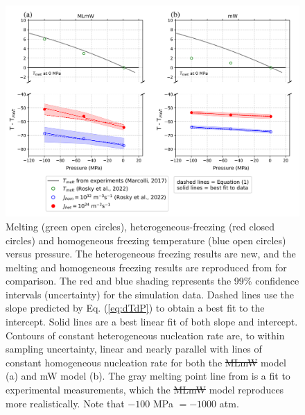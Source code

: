 \documentclass[journal abbreviation, manuscript]{copernicus}
\providecommand{\DIFadd}[1]{{\protect\color{blue}\uwave{#1}}} %
\providecommand{\DIFdel}[1]{{\protect\color{red}\sout{#1}}}                      %
\providecommand{\DIFaddFL}[1]{\DIFadd{#1}} %
\providecommand{\DIFdelFL}[1]{\DIFdel{#1}} %
\providecommand{\DIFaddbeginFL}{} %
\providecommand{\DIFaddendFL}{} %
\providecommand{\DIFdelbeginFL}{} %
\providecommand{\DIFdelendFL}{} %
\begin{document}
\begin{figure}[t]
\includegraphics[width=12cm]{figures/homohet_PT_figure.png}
\caption{\label{fig:PT} Melting (green open circles), heterogeneous-freezing (red closed circles) and homogeneous freezing temperature (blue open circles) versus pressure. The heterogeneous freezing results are new, and the melting and homogeneous freezing results are reproduced from \citet{rosky2022} for comparison. The red and blue shading represents the 99\% confidence intervals (uncertainty) for the simulation data. Dashed lines use the slope predicted by Eq. (\ref{eq:dTdP}) to obtain a best fit to the intercept. Solid lines are a best linear fit of both slope and intercept. Contours of constant heterogeneous nucleation rate are, to within sampling uncertainty, linear and nearly parallel with lines of constant homogeneous nucleation rate for both the \DIFdelbeginFL \DIFdelFL{MLmW }\DIFdelendFL \DIFaddbeginFL \DIFaddFL{ML-mW }\DIFaddendFL model (a) and mW model (b).  The gray melting point line from \citet{marcolli2017} is a fit to experimental measurements, which the \DIFdelbeginFL \DIFdelFL{MLmW }\DIFdelendFL \DIFaddbeginFL \DIFaddFL{ML-mW }\DIFaddendFL model reproduces more realistically. Note that $-100$ MPa $= -1000$ atm.}
\end{figure}
\end{document}
